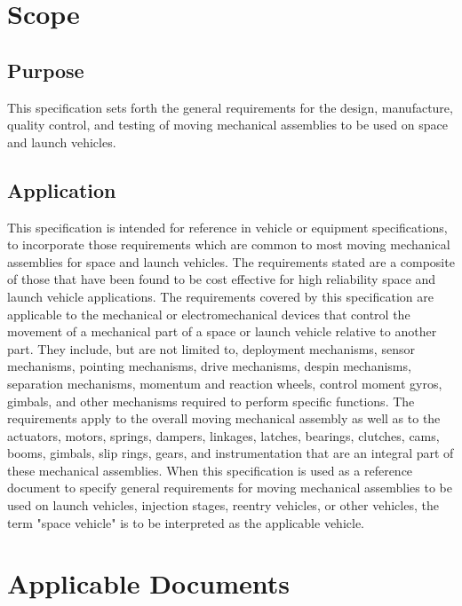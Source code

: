 \documentclass[12pt]{article}
\begin{document}
\newpage

\section{Scope}

\subsection{Purpose} 
This specification sets forth the general requirements for the design, manufacture, quality control, and testing of moving mechanical assemblies to be used on space and launch vehicles.

\subsection{Application}
This specification is intended for reference in vehicle or equipment specifications, to incorporate those requirements which are common to most moving mechanical assemblies for space and launch vehicles. 
The requirements stated are a composite of those that have been found to be cost effective for high reliability space and launch vehicle applications. 
The requirements covered by this specification are applicable to the mechanical or electromechanical devices that control the movement of a mechanical part of a space or launch vehicle relative to another part. 
They include, but are not limited to, deployment mechanisms, sensor mechanisms, pointing mechanisms, drive mechanisms, despin mechanisms, separation mechanisms, momentum and reaction wheels, control moment gyros, gimbals, and other mechanisms required to perform specific functions. 
The requirements apply to the overall moving mechanical assembly as well as to the actuators, motors, springs, dampers, linkages, latches, bearings, clutches, cams, booms, gimbals, slip rings, gears, and instrumentation that are an integral part of these mechanical assemblies. 
When this specification is used as a reference document to specify general requirements for moving mechanical assemblies to be used on launch vehicles, injection stages, reentry vehicles, or other vehicles, the term "space vehicle" is to be interpreted as the applicable vehicle.

\section{Applicable Documents}
\end{document}
